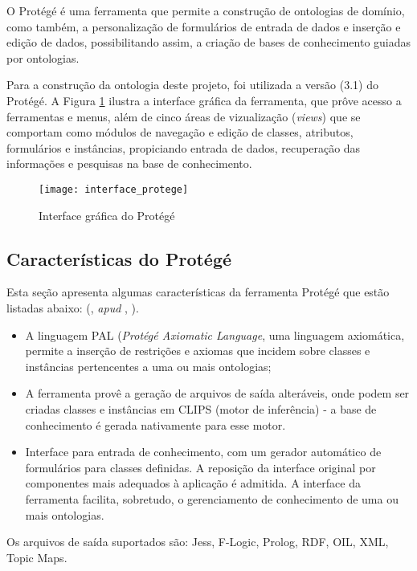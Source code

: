   
  O Protégé é uma ferramenta que permite a construção de ontologias de domínio, como também, a personalização de formulários
  de entrada de dados e inserção e edição de dados,  possibilitando assim, a criação de bases de conhecimento guiadas por ontologias.
  \cite{semprebom07}
  
  Para a construção da ontologia deste projeto, foi utilizada a versão (3.1) do Protégé. A Figura \ref{fig:interface_protege} ilustra
  a interface gráfica da ferramenta, que prôve acesso a ferramentas e menus, além de cinco áreas de vizualização (\textit{views}) que 
  se comportam como módulos de navegação e edição de classes, atributos, formulários e instâncias, propiciando entrada de dados,
  recuperação das informações e pesquisas na base de conhecimento. \cite{semprebom07}
  
  \begin{figure}[h] 
    \centering 
    \texttt{[image: interface\_protege]} 
    \caption[Interface gráfica do Protégé]
    {Interface gráfica do Protégé}
    \label{fig:interface_protege}
  \end{figure}
  
\subsection{Características do Protégé}

  Esta seção apresenta algumas características da ferramenta Protégé que estão listadas abaixo: 
  (\citeauthor{semprebom07}, \citeyear{semprebom07} \textit{apud} \citeauthor{freitas04}, \citeyear{freitas04}).
  
  \begin{itemize}
    \item A linguagem PAL (\textit{Protégé Axiomatic Language}, uma linguagem axiomática, permite a inserção de restrições e axiomas
    que incidem sobre classes e instâncias pertencentes a uma ou mais ontologias;
    \item A ferramenta provê a geração de arquivos de saída alteráveis, onde podem ser criadas classes e instâncias em CLIPS (motor 
    de inferência) - a base de conhecimento é gerada nativamente para esse motor.
    \item Interface para entrada de conhecimento, com um gerador automático de formulários para classes definidas. A reposição da interface
    original por componentes mais adequados à aplicação é admitida. A interface da ferramenta facilita, sobretudo, o gerenciamento de
    conhecimento de uma ou mais ontologias.    
  \end{itemize} 
  
      Os arquivos de saída suportados são: Jess, F-Logic, Prolog, RDF, OIL, XML, Topic Maps. \cite{semprebom07}